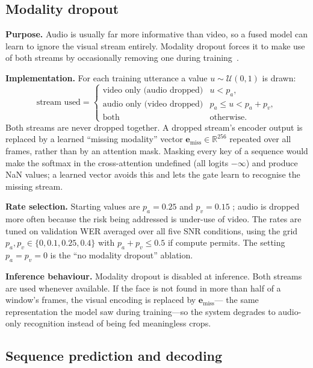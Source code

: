 \subsection{Modality dropout}
\label{sec:modality-dropout}
\textbf{Purpose.} Audio is usually far more informative than video, so a fused
model can learn to ignore the visual stream entirely. Modality dropout forces it
to make use of both streams by occasionally removing one during
training~\cite{afouras2022}.

\textbf{Implementation.} For each training utterance a value $u \sim
\mathcal{U}(0,1)$ is drawn:
\begin{equation}
\text{stream used} =
\begin{cases}
\text{video only (audio dropped)} & u < p_a,\\
\text{audio only (video dropped)} & p_a \le u < p_a + p_v,\\
\text{both} & \text{otherwise}.
\end{cases}
\end{equation}
Both streams are never dropped together. A dropped stream's encoder output is
replaced by a learned ``missing modality'' vector $\mathbf{e}_{\text{miss}}\in\mathbb{R}^{256}$
repeated over all frames, rather than by an attention mask. Masking every key of
a sequence would make the softmax in the cross-attention undefined (all logits
$-\infty$) and produce NaN values; a learned vector avoids this and lets the gate
learn to recognise the missing stream.

\textbf{Rate selection.} Starting values are $p_a=0.25$ and $p_v=0.15$ \rec;
audio is dropped more often because the risk being addressed is under-use of
video. The rates are tuned on validation WER averaged over all five SNR
conditions, using the grid $p_a,p_v \in \{0, 0.1, 0.25, 0.4\}$ with $p_a+p_v\le0.5$
if compute permits. The setting $p_a=p_v=0$ is the ``no modality dropout''
ablation.

\textbf{Inference behaviour.} Modality dropout is disabled at inference. Both
streams are used whenever available. If the face is not found in more than half
of a window's frames, the visual encoding is replaced by $\mathbf{e}_{\text{miss}}$---
the same representation the model saw during training---so the system degrades
to audio-only recognition instead of being fed meaningless crops.

\subsection{Sequence prediction and decoding}
\label{sec:ctc}

